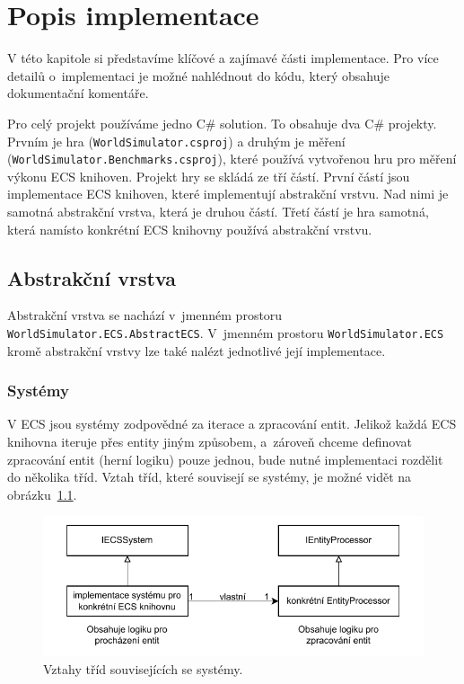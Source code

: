 \chapter{Popis implementace}
V této kapitole si představíme klíčové a zajímavé části implementace. Pro více detailů o~implementaci je možné nahlédnout do kódu, který obsahuje dokumentační komentáře.

Pro celý projekt používáme jedno C\# solution. To obsahuje dva C\# projekty. Prvním je hra (\texttt{WorldSimulator.csproj}) a druhým je měření (\texttt{WorldSimulator.Benchmarks.csproj}), které používá vytvořenou hru pro měření výkonu ECS knihoven. Projekt hry se skládá ze tří částí. První částí jsou implementace ECS knihoven, které implementují abstrakční vrstvu. Nad nimi je samotná abstrakční vrstva, která je druhou částí. Třetí částí je hra samotná, která namísto konkrétní ECS knihovny používá abstrakční vrstvu.

\section{Abstrakční vrstva}
\label{sec:abstract-layer}
Abstrakční vrstva se nachází v~jmenném prostoru \texttt{WorldSimulator.ECS.AbstractECS}. V~jmenném prostoru \texttt{WorldSimulator.ECS} kromě abstrakční vrstvy lze také nalézt jednotlivé její implementace.

\subsection{Systémy}
V ECS jsou systémy zodpovědné za iterace a zpracování entit. Jelikož každá ECS knihovna iteruje přes entity jiným způsobem, a~zároveň chceme definovat zpracování entit (herní logiku) pouze jednou, bude nutné implementaci rozdělit do několika tříd. Vztah tříd, které souvisejí se systémy, je možné vidět na obrázku~\ref{fig:abstract-layer-systems}.

\begin{figure}[!htb]
  \centering
  \includegraphics[width=0.8\linewidth]{img/abstract-layer-systems.pdf}
  \caption{Vztahy tříd souvisejících se systémy.}
  \label{fig:abstract-layer-systems}
\end{figure}


